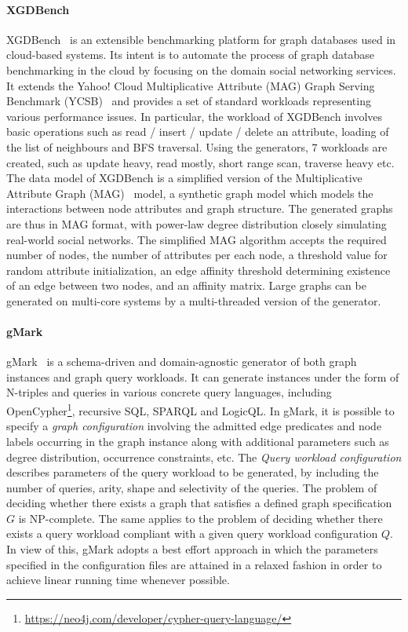 \paragraph{XGDBench} XGDBench~\cite{Dayarathna:2014:GDB:2676904.2676939} is an extensible  benchmarking platform for graph databases used in cloud-based systems. Its intent is to automate
the process of graph database benchmarking in the cloud by focusing on the domain social networking services. It extends the Yahoo! Cloud Multiplicative Attribute (MAG) Graph Serving Benchmark (YCSB)~\cite{Cooper:2010:BCS:1807128.1807152} and provides a set of standard workloads representing various performance issues. In particular, the workload of XGDBench involves basic operations such as read / insert / update / delete an attribute, loading of the list of neighbours and BFS traversal. Using the generators, 7 workloads are created, such as update heavy, read mostly, short range scan, traverse heavy etc.
The data model of XGDBench is a simplified version of the Multiplicative Attribute Graph (MAG)~\cite{Kim2010} model, a synthetic graph model which models the interactions between node attributes and  graph structure.
The generated graphs are thus in MAG format, with power-law degree distribution closely simulating real-world social networks.
The simplified MAG algorithm accepts the required number of nodes, the number of attributes per each node, a threshold value for random attribute initialization, an edge affinity threshold determining existence of an edge between two nodes, and an affinity matrix. \iffalse It has been proven that MAG generates graphs with both analytically tractable and statistically interesting properties.\fi 
Large graphs can be generated on multi-core systems by a multi-threaded version of the  generator.


\paragraph{gMark}  gMark~\cite{gMark} is a schema-driven and domain-agnostic generator of both graph instances and graph query workloads. It can generate instances under the form of N-triples and queries in various concrete query languages, including OpenCypher\footnote{\url{https://neo4j.com/developer/cypher-query-language/}}, recursive SQL, SPARQL and LogicQL. In gMark, it is possible to specify a \emph{graph configuration} involving the admitted edge predicates and node labels occurring in the graph instance along with additional parameters such as degree distribution, occurrence constraints, etc. The \emph{Query workload configuration} describes parameters of the query workload to be generated, by including the number of queries, arity, shape and selectivity of the queries.
The problem of deciding whether there exists a graph that satisfies a defined graph specification $G$ is NP-complete. The same applies to the problem of deciding
whether there exists a query workload compliant with a given query workload configuration $Q$. In view of this, gMark adopts a best effort approach in which the
parameters specified in the configuration files are attained in a relaxed fashion in order to achieve linear running time whenever possible.


